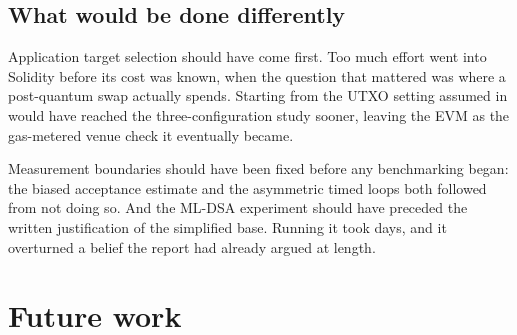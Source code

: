 \subsection{What would be done differently}
\label{sec:reflection-differently}

Application target selection should have come first. Too much effort went into Solidity
before its cost was known, when the question that mattered was where a post-quantum swap
actually spends. Starting from the UTXO setting assumed in \cite{esgin2020post} would have
reached the three-configuration study sooner, leaving the EVM as the gas-metered venue
check it eventually became.

Measurement boundaries should have been fixed before any benchmarking began: the
biased acceptance estimate and the asymmetric timed loops both followed from not doing so.
And the ML-DSA experiment should have preceded the written justification of the simplified
base. Running it took days, and it overturned a belief the report
had already argued at length.

\section{Future work}
\label{sec:future}

